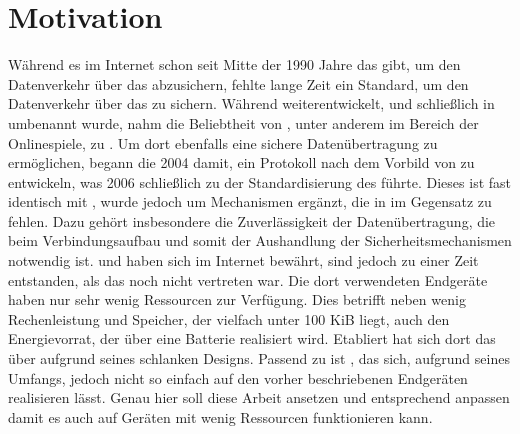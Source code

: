 \section{Motivation}
Während es im Internet schon seit Mitte der 1990 Jahre das  gibt, um den Datenverkehr
über das  abzusichern, fehlte lange Zeit ein Standard, um den Datenverkehr über das  zu sichern.
Während  weiterentwickelt, und schließlich in  \cite{rfc5246} umbenannt wurde, nahm die
Beliebtheit von , unter anderem im Bereich der Onlinespiele, zu \cite[Kapitel 1]{rfc6347}. Um dort ebenfalls
eine sichere Datenübertragung zu ermöglichen, begann die  2004 damit, ein Protokoll nach dem Vorbild von  zu entwickeln,
was 2006 schließlich zu der Standardisierung des  \cite{rfc6347} führte. Dieses ist fast identisch mit , wurde jedoch um
Mechanismen ergänzt, die in  im Gegensatz zu  fehlen. Dazu gehört insbesondere die Zuverlässigkeit der Datenübertragung,
die beim Verbindungsaufbau und somit der Aushandlung der Sicherheitsmechanismen notwendig ist.  und  haben sich im Internet
bewährt, sind jedoch zu einer Zeit entstanden, als das  noch nicht vertreten war. Die dort verwendeten Endgeräte haben nur sehr wenig
Ressourcen zur Verfügung. Dies betrifft neben wenig Rechenleistung und Speicher, der vielfach unter 100 KiB liegt, auch den Energievorrat, der
über eine Batterie realisiert wird. Etabliert hat sich dort das  \cite{draftcoap13} über  aufgrund seines schlanken Designs.
Passend zu  ist , das sich, aufgrund seines Umfangs, jedoch nicht so einfach auf den vorher beschriebenen Endgeräten realisieren
lässt. Genau hier soll diese Arbeit ansetzen und  entsprechend anpassen damit es auch auf Geräten mit wenig Ressourcen funktionieren kann.
